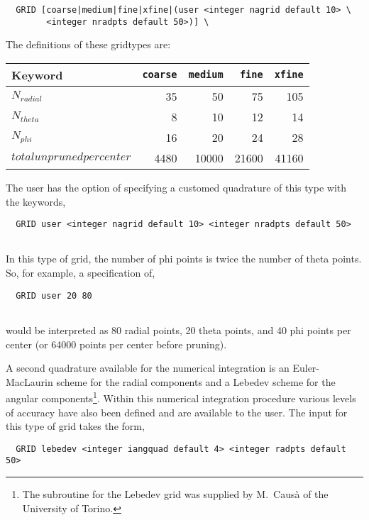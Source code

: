 \begin{verbatim}
  GRID [coarse|medium|fine|xfine|(user <integer nagrid default 10> \
        <integer nradpts default 50>)] \

\end{verbatim}

The definitions of these gridtypes are:\\


  \begin{tabular}[right]{|l|r r r r|} \hline
Keyword & {\tt coarse} & {\tt medium} & {\tt fine} & {\tt xfine} \\ \hline
$N_{radial}$ & 35 & 50 & 75 & 105 \\
$N_{theta}$ & 8 & 10 & 12 & 14 \\  \hline
$N_{phi}$ & 16 & 20 & 24 & 28 \\  \hline
$total unpruned per center$ & 4480 & 10000 & 21600 & 41160 \\  \hline
  \end{tabular}

The user has the option of specifying a customed quadrature of this
type with the keywords,

\begin{verbatim}
  GRID user <integer nagrid default 10> <integer nradpts default 50>
        
\end{verbatim}

In this type of grid, the number of phi points is twice the number of
theta points. So, for example, a specification of,

\begin{verbatim}
  GRID user 20 80
        
\end{verbatim}

would be interpreted as 80 radial points, 20 theta points, and 40
phi points per center (or 64000 points per center before pruning).

A second quadrature available for the numerical integration is an
Euler-MacLaurin scheme for the radial components and a Lebedev
scheme for the angular components\footnote{The subroutine 
for the Lebedev grid was supplied by M.~Caus\`a of the University of
Torino.}.  Within this numerical integration procedure various levels 
of accuracy have also been defined and are available to the user.  
The input for this type of grid takes the form,

\begin{verbatim}
  GRID lebedev <integer iangquad default 4> <integer radpts default 50>

\end{verbatim}

